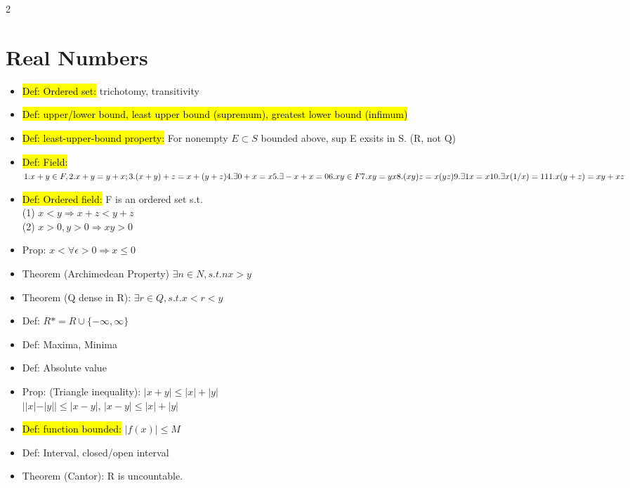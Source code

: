 \documentclass[a4paper,10pt]{article}
\begin{document}
\begin{multicols}{2}
\begin{itemize}
\end{itemize}

\section*{Real Numbers}
\begin{itemize}
    \item \hl{Def: Ordered set:} trichotomy, transitivity
    \item \hl{Def: upper/lower bound, least upper bound (supremum), greatest lower bound (infimum)}
    \item \hl{Def: least-upper-bound property:} For nonempty $E\subset S$ bounded above, sup E exsits in S. (R, not Q)
    \item \hl{Def: Field:} \\
    $1. x+y\in F,\\ 
    2. x+y=y+x;\\ 
    3. (x+y)+z=x+(y+z)\\ 
    4. \exists 0+x=x\\
    5. \exists -x+x=0\\ 
    6. xy\in F\\
    7. xy=yx\\
    8. (xy)z=x(yz)\\
    9. \exists 1x=x\\
    10. \exists x(1/x)=1\\
    11. x(y+z)=xy+xz$
    \item \hl{Def: Ordered field:} F is an ordered set s.t.\\
    (1) $x<y\Rightarrow x+z<y+z$\\
    (2) $x>0, y>0 \Rightarrow xy>0$
    \item Prop: $x<\forall \epsilon>0\Rightarrow x\le 0$
    \item Theorem (Archimedean Property) $\exists n \in N,s.t.nx>y$
    \item Theorem (Q dense in R): $\exists r\in Q, s.t. x<r<y$
    \item Def: $R*=R\cup \{-\infty,\infty\}$
    \item Def: Maxima, Minima
    \item Def: Absolute value
    \item Prop: (Triangle inequality): $|x+y|\le|x|+|y|$\\
    $||x|-|y||\le |x-y|$, $|x-y|\le |x|+|y|$
    \item \hl{Def: function bounded:} $|f(x)|\le M$
    \item Def: Interval, closed/open interval
    \item Theorem (Cantor): R is uncountable.
    

\end{itemize}
\end{multicols}
\end{document}
